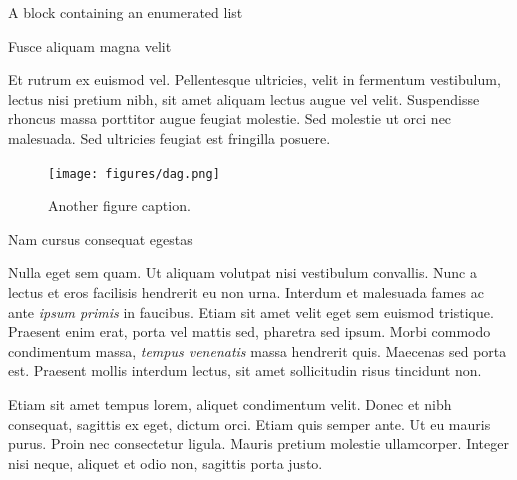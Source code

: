 \documentclass[final]{beamer}
\newlength{\colwidth}
\begin{document}
\begin{frame}[t]
\begin{columns}[t]
\begin{column}{\colwidth}
\begin{block}{A block containing an enumerated list}
				\end{block}
				
				\begin{block}{Fusce aliquam magna velit}
					
					Et rutrum ex euismod vel. Pellentesque ultricies, velit in fermentum
					vestibulum, lectus nisi pretium nibh, sit amet aliquam lectus augue vel
					velit. Suspendisse rhoncus massa porttitor augue feugiat molestie. Sed
					molestie ut orci nec malesuada. Sed ultricies feugiat est fringilla
					posuere.
					
					\begin{figure}
						\centering
						\texttt{[image: figures/dag.png]}
						
						\caption{Another figure caption.}
					\end{figure}
					
				\end{block}
				
				\begin{block}{Nam cursus consequat egestas}
					
					Nulla eget sem quam. Ut aliquam volutpat nisi vestibulum convallis. Nunc a
					lectus et eros facilisis hendrerit eu non urna. Interdum et malesuada fames
					ac ante \textit{ipsum primis} in faucibus. Etiam sit amet velit eget sem
					euismod tristique. Praesent enim erat, porta vel mattis sed, pharetra sed
					ipsum. Morbi commodo condimentum massa, \textit{tempus venenatis} massa
					hendrerit quis. Maecenas sed porta est. Praesent mollis interdum lectus,
					sit amet sollicitudin risus tincidunt non.
					
					Etiam sit amet tempus lorem, aliquet condimentum velit. Donec et nibh
					consequat, sagittis ex eget, dictum orci. Etiam quis semper ante. Ut eu
					mauris purus. Proin nec consectetur ligula. Mauris pretium molestie
					ullamcorper. Integer nisi neque, aliquet et odio non, sagittis porta justo.
					

\end{block}
\end{column}
\end{columns}
\end{frame}
\end{document}
